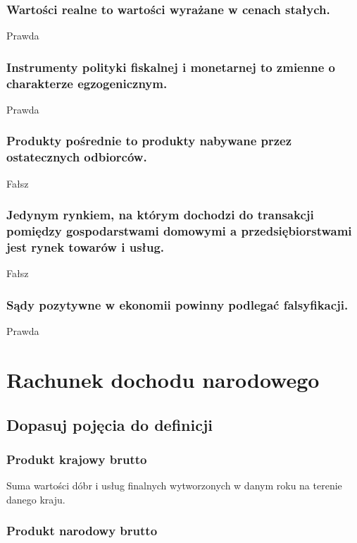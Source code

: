 \documentclass[a4paper,12pt]{article}
\let\oldsection\section
\renewcommand\section{\clearpage\oldsection}
\begin{document}
\subsubsection{Wartości realne to wartości wyrażane w cenach stałych.}

Prawda

\subsubsection{Instrumenty polityki fiskalnej i monetarnej to zmienne o charakterze egzogenicznym.}

Prawda

\subsubsection{Produkty pośrednie to produkty nabywane przez ostatecznych odbiorców.}

Fałsz

\subsubsection{Jedynym rynkiem, na którym dochodzi do transakcji pomiędzy gospodarstwami domowymi a przedsiębiorstwami jest rynek towarów i usług.}

Fałsz

\subsubsection{Sądy pozytywne w ekonomii powinny podlegać falsyfikacji.}

Prawda

\section{Rachunek dochodu narodowego}

\subsection{Dopasuj pojęcia do definicji}

\subsubsection*{Produkt krajowy brutto}
Suma wartości dóbr i usług finalnych wytworzonych w danym roku na terenie danego kraju.

\subsubsection*{Produkt narodowy brutto}
\end{document}
